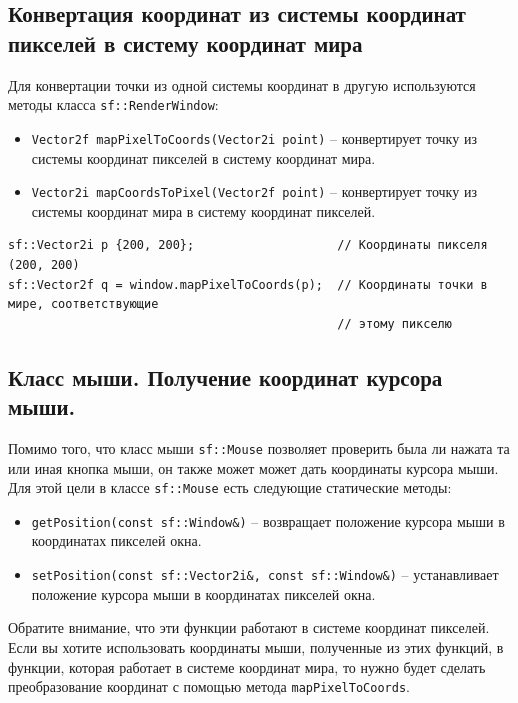 \documentclass{article}
\begin{document}
\subsection*{Конвертация координат из системы координат пикселей в систему координат мира}
Для конвертации точки из одной системы координат в другую используются методы класса \texttt{sf::RenderWindow}:
\begin{itemize}
\item \texttt{Vector2f 	mapPixelToCoords(Vector2i point)} -- конвертирует точку из системы координат пикселей в систему координат мира.
\item \texttt{Vector2i 	mapCoordsToPixel(Vector2f point)} -- конвертирует точку из системы координат мира в систему координат пикселей.
\end{itemize}
\begin{lstlisting}[frame=none]
sf::Vector2i p {200, 200};                    // Координаты пикселя (200, 200)
sf::Vector2f q = window.mapPixelToCoords(p);  // Координаты точки в мире, соответствующие 
                                              // этому пикселю
\end{lstlisting}


\newpage
\subsection*{Класс мыши. Получение координат курсора мыши.}
Помимо того, что класс мыши \texttt{sf::Mouse} позволяет проверить была ли нажата та или иная кнопка мыши, он также может может дать координаты курсора мыши. Для этой цели в классе \texttt{sf::Mouse} есть следующие статические методы:
\begin{itemize}
\item \texttt{getPosition(const sf::Window\&)} -- возвращает положение курсора мыши в координатах пикселей окна.
\item \texttt{setPosition(const sf::Vector2i\&, const sf::Window\&)} --  устанавливает положение курсора мыши в координатах пикселей окна.
\end{itemize}
Обратите внимание, что эти функции работают в системе координат пикселей. Если вы хотите использовать координаты мыши, полученные из этих функций, в функции, которая работает в системе координат мира, то нужно будет сделать преобразование координат с помощью метода \texttt{mapPixelToCoords}.
\end{document}
